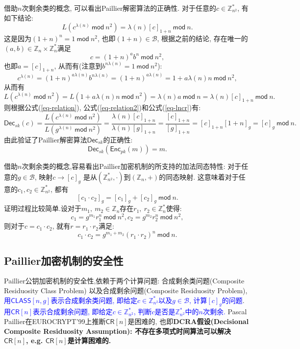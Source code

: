 \documentclass{article}
\newcommand{\Z}{\mathbb{Z}}
\newcommand{\blue}{\textcolor{blue}}
\begin{document}
借助$n$次剩余类的概念, 可以看出Paillier解密算法的正确性.
对于任意的$c\in\Z_{n^2}^*$, 有如下结论:
\begin{equation}\label{eq-lncr}
L(c^{\lambda(n)}~\textsf{mod}~n^2) = \lambda(n)[c]_{1+n}~\textsf{mod}~n.
\end{equation}
这是因为$(1+n)^n = 1 ~\textsf{mod}~n^2$, 也即$(1+n) \in \mathcal{B}$,
根据之前的结论, 存在唯一的$(a,b)\in\Z_n\times\Z_n^*$满足
$$
c = (1+n)^{a}b^n~\textsf{mod}~n^2,
$$
也即$a = [c]_{1+n}$, 从而有(注意到$b^{n\lambda(n)} = 1~\textsf{mod}~n^2$): 
$$
c^{\lambda(n)} = (1+n)^{a\lambda(n)}b^{n\lambda(n)} 
= (1+n)^{a\lambda(n)} = 1 + a\lambda(n)n~\textsf{mod}~n^2,
$$
从而有
$$
L\left(c^{\lambda(n)}~\textsf{mod}~n^2\right) = L\left(1 + a\lambda(n)n~\textsf{mod}~n^2\right) 
= \lambda(n) a ~\textsf{mod}~n = \lambda(n)[c]_{1+n}~\textsf{mod}~n.
$$
则根据公式(\ref{eq-relation}), 公式(\ref{eq-relation2})和公式(\ref{eq-lncr})有:
\begin{equation}\label{eq-decryption}
\textsf{Dec}_{sk}(c) = 
\frac{L\left(c^{\lambda(n)}~\textsf{mod}~n^2\right)}{L\left(g^{\lambda(n)}~\textsf{mod}~n^2\right)} =
\frac{\lambda(n)[c]_{1+n}}{\lambda(n)[g]_{1+n}} = \frac{[c]_{1+n}}{[g]_{1+n}} = 
[c]_{1+n}[1+n]_g = [c]_g ~\textsf{mod}~ n.
\end{equation}
由此验证了Paillier解密算法$\textsf{Dec}_{sk}$的正确性: 
$$
\textsf{Dec}_{sk}\left(\textsf{Enc}_{pk}(m)\right) = m.
$$

借助$n$次剩余类的概念,容易看出Paillier加密机制的所支持的加法同态特性:
对于任意的$g\in\mathcal{B}$, 映射$c\rightarrow [c]_g$
是从$(\Z_{n^2}^*, \cdot)$到$(\Z_n, +)$的同态映射. 
这意味着对于任意的$c_1, c_2 \in\Z_{n^2}^*$, 都有
$$
[c_1 \cdot c_2]_g = [c_1]_g + [c_2]_g ~\textsf{mod}~ n.
$$
证明过程比较简单.设对于$m_1,\ m_2\in \Z_n$存在$r_1,\ r_2 \in \Z_n^*$使得:
$$
c_1 = g^{m_1}r_1^n ~\textsf{mod}~ n^2, c_2 = g^{m_2}r_2^n ~\textsf{mod}~ n^2,
$$
则对于$c = c_1 \cdot c_2$, 就有$r = r_1 \cdot r_2$满足:
$$
c_1\cdot c_2 = g^{m_1 + m_2}(r_1 \cdot r_2)^n ~\textsf{mod}~ n.
$$

\subsection{Paillier加密机制的安全性}

Paillier公钥加密机制的安全性,依赖于两个计算问题: 
合成剩余类问题(Composite Residuosity Class Problem)
以及合成剩余问题(Composite Residuosity Problem),
\blue{用$\textsf{CLASS}[n, g]$表示合成剩余类问题, 即给定$c\in\Z_{n^2}^*$以及$g\in\mathcal{B}$, 
计算$[c]_g$的问题}. \blue{用$\textsf{CR}[n]$表示合成剩余问题, 
即给定$c\in\Z_{n^2}^*$, 判断$c$是否是$\Z_{n^2}^*$中的$n$次剩余.}
Pascal Paillier在EUROCRYPT'99上推断$\textsf{CR}[n]$是困难的, 
也即\textbf{DCRA假设(Decisional Composite Residuosity Assumption):
不存在多项式时间算法可以解决$\textsf{CR}[n]$, e.g. $\textsf{CR}[n]$是计算困难的.}
\end{document}

